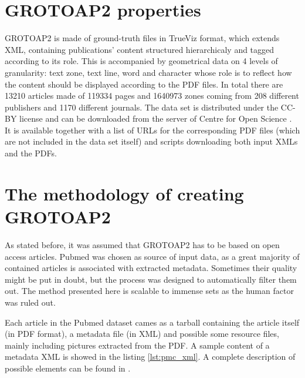 \section{GROTOAP2 properties}
GROTOAP2 is made of ground-truth files in TrueViz format, which extends XML, containing publications' content structured hierarchicaly and tagged according to its role. This is accompanied by geometrical data on 4 levels of granularity: text zone, text line, word and character whose role is to reflect how the content should be displayed according to the PDF files. In total there are 13210 articles made of 119334 pages and 1640973 zones coming from 208 different publishers and 1170 different journals. The data set is distributed under the CC-BY license and can be downloaded from the server of Centre for Open Science \cite{CeON}. It is available together with a list of URLs for the corresponding PDF files (which are not included in the data set itself) and scripts downloading both input XMLs and the PDFs.


\qquad
\section{The methodology of creating GROTOAP2}
As stated before, it was assumed that GROTOAP2 has to be based on open access articles. Pubmed was chosen as source of input data, as a great majority of contained articles is associated with extracted metadata. Sometimes their quality might be put in doubt, but the process was designed to automatically filter them out. The method presented here is scalable to immense sets as the human factor was ruled out.

Each article in the Pubmed dataset cames as a tarball containing the article itself (in PDF format), a metadata file (in XML) and possible some resource files, mainly including pictures extracted from the PDF. A sample content of a metadata XML is showed in the listing \ref{lst:pmc_xml}. A complete description of possible elements can be found in \cite{PubmedXML}.


